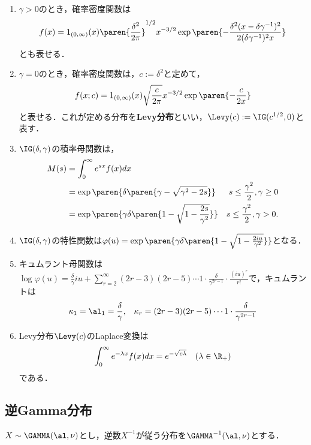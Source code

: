 \documentclass[uplatex,dvipdfmx]{jsreport}
\begin{document}
\begin{lemma}\mbox{}
    \begin{enumerate}
        \item $\gamma>0$のとき，確率密度関数は
        \[f(x)=1_{(0,\infty)}(x)\paren{\frac{\delta^2}{2\pi}}^{1/2}x^{-3/2}\exp\paren{-\frac{\delta^2(x-\delta\gamma^{-1})^2}{2(\delta\gamma^{-1})^2x}}\]
        とも表せる．
        \item $\gamma=0$のとき，確率密度関数は，$c:=\delta^2$と定めて，
        \[f(x;c)=1_{(0,\infty)}(x)\sqrt{\frac{c}{2\pi}}x^{-3/2}\exp\paren{-\frac{c}{2x}}\]
        と表せる．これが定める分布を\textbf{Levy分布}といい，$\Levy(c):=\IG(c^{1/2},0)$と表す．
        \item $\IG(\delta,\gamma)$の積率母関数は，
        \begin{align*}
            M(s)&=\int^\infty_0e^{sx}f(x)dx\\
            &=\exp\paren{\delta\paren{\gamma-\sqrt{\gamma^2-2s}}}&s\le\frac{\gamma^2}{2},\gamma\ge0\\
            &=\exp\paren{\gamma\delta\paren{1-\sqrt{1-\frac{2s}{\gamma^2}}}}&s\le\frac{\gamma^2}{2},\gamma>0.
        \end{align*}
        \item $\IG(\delta,\gamma)$の特性関数は$\varphi(u)=\exp\paren{\gamma\delta\paren{1-\sqrt{1-\frac{2iu}{\gamma^2}}}}$となる．
        \item キュムラント母関数は$\log\varphi(u)=\frac{\delta}{\gamma}iu+\sum^\infty_{r=2}(2r-3)(2r-5)\cdots 1\cdot\frac{\delta}{\gamma^{2r-1}}\cdot\frac{(iu)^r}{r!}$で，キュムラントは
        \begin{align*}
            \kappa_1&=\al_1=\frac{\delta}{\gamma},&\kappa_r=(2r-3)(2r-5)\cdots 1\cdot\frac{\delta}{\gamma^{2r-1}}
        \end{align*}
        \item Levy分布$\Levy(c)$のLaplace変換は
        \[\int^\infty_0e^{-\lambda x}f(x)dx=e^{-\sqrt{c\lambda}}\quad(\lambda\in\R_+)\]
        である．
    \end{enumerate}
\end{lemma}

\subsection{逆Gamma分布}

\begin{definition}
    $X\sim\GAMMA(\al,\nu)$とし，逆数$X^{-1}$が従う分布を$\GAMMA^{-1}(\al,\nu)$とする．
\end{definition}
\end{document}
